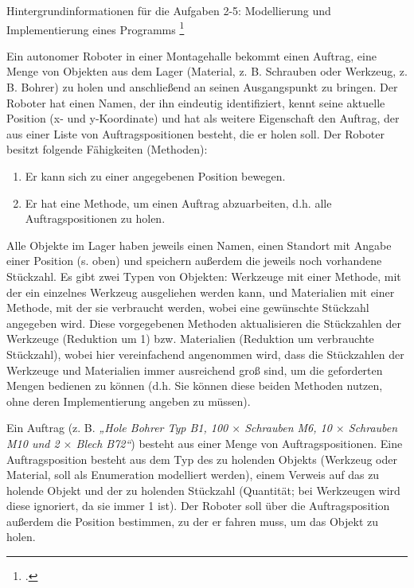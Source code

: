 \documentclass{bschlangaul-aufgabe}
\begin{document}

Hintergrundinformationen für die Aufgaben 2-5: Modellierung und
Implementierung eines Programms
\footcite{examen:66116:2019:03}

\begin{mdframed}[backgroundcolor=white]
\footnotesize
Ein autonomer Roboter in einer Montagehalle bekommt einen Auftrag, eine
Menge von Objekten aus dem Lager (Material, z. B. Schrauben oder
Werkzeug, z. B. Bohrer) zu holen und anschließend an seinen
Ausgangspunkt zu bringen. Der Roboter hat einen Namen, der ihn eindeutig
identifiziert, kennt seine aktuelle Position (x- und y-Koordinate) und
hat als weitere Eigenschaft den Auftrag, der aus einer Liste von
Auftragspositionen besteht, die er holen soll. Der Roboter besitzt
folgende Fähigkeiten (Methoden):

\begin{enumerate}
\item Er kann sich zu einer angegebenen Position bewegen.

\item Er hat eine Methode, um einen Auftrag abzuarbeiten, d.h. alle
Auftragspositionen zu holen.
\end{enumerate}

Alle Objekte im Lager haben jeweils einen Namen, einen Standort mit
Angabe einer Position (s. oben) und speichern außerdem die jeweils noch
vorhandene Stückzahl. Es gibt zwei Typen von Objekten: Werkzeuge mit
einer Methode, mit der ein einzelnes Werkzeug ausgeliehen werden kann,
und Materialien mit einer Methode, mit der sie verbraucht werden, wobei
eine gewünschte Stückzahl angegeben wird. Diese vorgegebenen Methoden
aktualisieren die Stückzahlen der Werkzeuge (Reduktion um 1) bzw.
Materialien (Reduktion um verbrauchte Stückzahl), wobei hier
vereinfachend angenommen wird, dass die Stückzahlen der Werkzeuge und
Materialien immer ausreichend groß sind, um die geforderten Mengen
bedienen zu können (d.h. Sie können diese beiden Methoden nutzen, ohne
deren Implementierung angeben zu müssen).

Ein Auftrag (z. B. \emph{„Hole Bohrer Typ B1, 100 $\times$ Schrauben M6,
10 $\times$ Schrauben M10 und 2 $\times$ Blech B72“}) besteht aus einer
Menge von Auftragspositionen. Eine Auftragsposition besteht aus dem Typ
des zu holenden Objekts (Werkzeug oder Material, soll als Enumeration
modelliert werden), einem Verweis auf das zu holende Objekt und der zu
holenden Stückzahl (Quantität; bei Werkzeugen wird diese ignoriert, da
sie immer 1 ist). Der Roboter soll über die Auftragsposition außerdem
die Position bestimmen, zu der er fahren muss, um das Objekt zu holen.


\end{mdframed}
\end{document}
